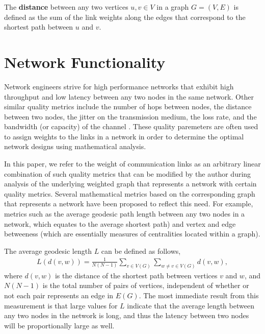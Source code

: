 \documentclass[doc]{apa}%
\begin{document}
\begin{define}
The \textbf{distance} between any two vertices $u, v \in V$ in a graph $G = (V,E)$ is defined as the sum of the link weights along the edges that correspond to the shortest path between $u$ and $v$.
\end{define}

\section{Network Functionality}
\label{NetworkFunctionality}

Network engineers strive for high performance networks that exhibit high throughput and low latency between any two nodes in the same network. Other similar quality metrics include the number of hops between nodes, the distance between two nodes, the jitter on the transmission medium, the loss rate, and the bandwidth (or capacity) of the channel \cite{LargeNetworkRobustnessPVM}. These quality paremeters are often used to assign weights to the links in a network in order to determine the optimal network designs using mathematical analysis. 


In this paper, we refer to the weight of communication links as an arbitrary linear combination of such quality metrics that can be modified by the author during analysis of the underlying weighted graph that represents a network with certain quality metrics. Several mathematical metrics based on the corresponding graph that represents a network have been proposed to reflect this need. For example, metrics such as the average geodesic path length between any two nodes in a network, which equates to the average shortest path) and vertex and edge betweeness (which are essentially measures of centralities located within a graph). 

The average geodesic length $L$ can be defined as follows,
\begin{eqnarray*}
L(d(v,w)) = \frac{1}{N(N-1)}\sum_{v \in V(G)}\sum_{w \not= v \in V(G)} d(v,w),
\end{eqnarray*}
where $d(v,w)$ is the distance of the shortest path between vertices $v$ and $w$, and $N(N-1)$ is the total number of pairs of vertices, independent of whether or not each pair represents an edge in $E(G)$. The most immediate result from this measurement is that large values for $L$ indicate that the average length between any two nodes in the network is long, and thus the latency between two nodes will be proportionally large as well. 
\end{document}
